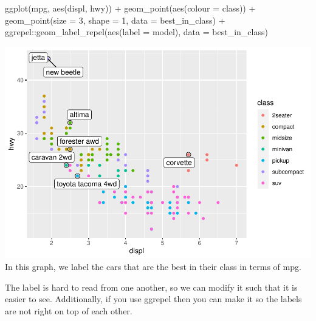 \documentclass[
]{article}
\newenvironment{Shaded}{\begin{snugshade}}{\end{snugshade}}
\newcommand{\AttributeTok}[1]{\textcolor[rgb]{0.77,0.63,0.00}{#1}}
\newcommand{\DecValTok}[1]{\textcolor[rgb]{0.00,0.00,0.81}{#1}}
\newcommand{\FunctionTok}[1]{\textcolor[rgb]{0.00,0.00,0.00}{#1}}
\newcommand{\NormalTok}[1]{#1}
\newcommand{\SpecialCharTok}[1]{\textcolor[rgb]{0.00,0.00,0.00}{#1}}
\begin{document}
\begin{Shaded}
\begin{Highlighting}[]
\FunctionTok{ggplot}\NormalTok{(mpg, }\FunctionTok{aes}\NormalTok{(displ, hwy)) }\SpecialCharTok{+}
  \FunctionTok{geom\_point}\NormalTok{(}\FunctionTok{aes}\NormalTok{(}\AttributeTok{colour =}\NormalTok{ class)) }\SpecialCharTok{+}
  \FunctionTok{geom\_point}\NormalTok{(}\AttributeTok{size =} \DecValTok{3}\NormalTok{, }\AttributeTok{shape =} \DecValTok{1}\NormalTok{, }\AttributeTok{data =}\NormalTok{ best\_in\_class) }\SpecialCharTok{+}
\NormalTok{  ggrepel}\SpecialCharTok{::}\FunctionTok{geom\_label\_repel}\NormalTok{(}\FunctionTok{aes}\NormalTok{(}\AttributeTok{label =}\NormalTok{ model), }\AttributeTok{data =}\NormalTok{ best\_in\_class)}
\end{Highlighting}
\end{Shaded}

\includegraphics{Journal_files/figure-latex/unnamed-chunk-52-3.pdf} In
this graph, we label the cars that are the best in their class in terms
of mpg.

The label is hard to read from one another, so we can modify it such
that it is easier to see. Additionally, if you use ggrepel then you can
make it so the labels are not right on top of each other.
\end{document}
